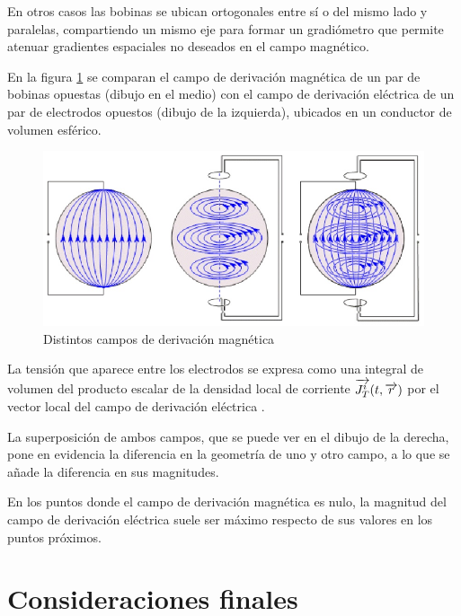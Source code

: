 En otros casos las bobinas se ubican ortogonales entre sí o del mismo lado y paralelas, compartiendo un mismo eje para formar un gradiómetro que permite atenuar gradientes espaciales no deseados en el campo magnético.

En la figura \ref{fig:619} se comparan el campo de derivación magnética de un par de bobinas opuestas (dibujo en el medio) con el campo de derivación eléctrica de un par de electrodos opuestos (dibujo de la izquierda), ubicados en un conductor de volumen esférico.


\begin{figure}[H]
    \centering
    \includegraphics[width=1.0\textwidth]{./Figures/fig619}
	\caption{Distintos campos de derivación magnética}
	\label{fig:619}
\end{figure}

La tensión que aparece entre los electrodos se expresa como una integral de volumen del producto escalar de la densidad local de corriente $\overrightarrow{J^{i}_{T}}(t, \overrightarrow{r})$ por el vector local del campo de derivación eléctrica \citep{Malmivuo_2000} \citep{5627910} \citep{Antola:1} .

La superposición de ambos campos, que se puede ver en el dibujo de la derecha, pone en evidencia la diferencia en la geometría de uno y otro campo, a lo que se añade la diferencia en sus magnitudes.

En los puntos donde el campo de derivación magnética es nulo, la magnitud del campo de derivación eléctrica suele ser máximo respecto de sus valores en los puntos próximos.

\section{Consideraciones finales}

